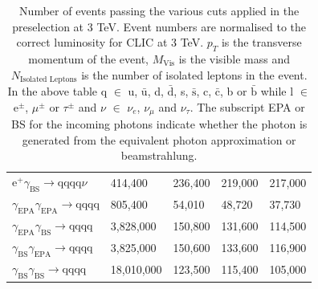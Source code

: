 \begin{table}[h!]
\begin{tabular}{ l l l l l}
$\text{e}^{+}\gamma_{\text{BS}} \rightarrow \text{qqqq}\nu$ & 414,400 & 236,400 & 219,000 & 217,000 \\
$\gamma_{\text{EPA}}\gamma_{\text{EPA}} \rightarrow \text{qqqq}$ & 805,400 & 54,010 & 48,720 & 37,730 \\ 
$\gamma_{\text{EPA}}\gamma_{\text{BS}} \rightarrow \text{qqqq}$ & 3,828,000 & 150,800 & 131,600 & 114,500 \\ 
$\gamma_{\text{BS}}\gamma_{\text{EPA}} \rightarrow \text{qqqq}$ & 3,825,000 & 150,600 & 133,600 & 116,900 \\ 
$\gamma_{\text{BS}}\gamma_{\text{BS}} \rightarrow \text{qqqq}$ & 18,010,000 & 123,500 & 115,400 & 105,000 \\
\hline
\end{tabular}
\caption[Number of events passing the various cuts applied in the preselection at 3 TeV.]{Number of events passing the various cuts applied in the preselection at 3 TeV.  Event numbers are normalised to the correct luminosity for CLIC at 3 TeV.  $p_{T}$ is the transverse momentum of the event,  $M_{\text{Vis}}$ is the visible mass and $N_{\text{Isolated Leptons}}$ is the number of isolated leptons in the event.  In the above table q $\in$ u, $\bar{\text{u}}$, d, $\bar{\text{d}}$, s, $\bar{\text{s}}$, c, $\bar{\text{c}}$, b or $\bar{\text{b}}$ while l $\in$ $\text{e}^{\pm}$, $\mu^{\pm}$ or $\tau^{\pm}$ and $\nu$ $\in$ $\nu_{e}$, $\nu_{\mu}$ and $\nu_{\tau}$.  The subscript EPA or BS for the incoming photons indicate whether the photon is generated from the equivalent photon approximation or beamstrahlung.}
\label{table:preselectionnumbers3000GeV}
\end{table}

